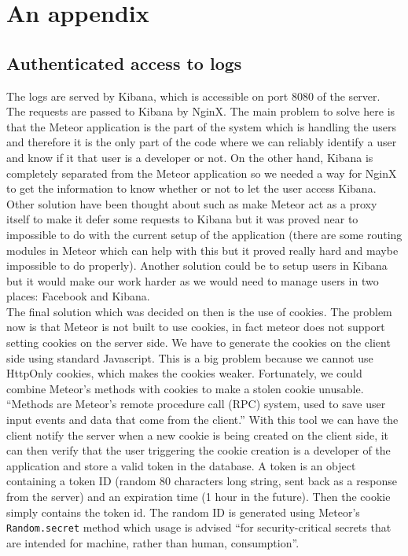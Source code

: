 \appendix
\chapter{An appendix}

\section{Authenticated access to logs}\label{appendix:cookies}
The logs are served by Kibana, which is accessible on port 8080 of the server. The requests are passed to Kibana by NginX. The main problem to solve here is that the Meteor application is the part of the system which is handling the users and therefore it is the only part of the code where we can reliably identify a user and know if it that user is a developer or not. On the other hand, Kibana is completely separated from the Meteor application so we needed a way for NginX to get the information to know whether or not to let the user access Kibana.\\
Other solution have been thought about such as make Meteor act as a proxy itself to make it defer some requests to Kibana but it was proved near to impossible to do with the current setup of the application (there are some routing modules in Meteor which can help with this but it proved really hard and maybe impossible to do properly). Another solution could be to setup users in Kibana but it would make our work harder as we would need to manage users in two places: Facebook and Kibana.\\
The final solution which was decided on then is the use of cookies. The problem now is that Meteor is not built to use cookies, in fact meteor does not support setting cookies on the server side. We have to generate the cookies on the client side using standard Javascript. This is a big problem because we cannot use HttpOnly cookies\cite{httponly}, which makes the cookies weaker. Fortunately, we could combine Meteor's methods with cookies to make a stolen cookie unusable.\\
``Methods are Meteor’s remote procedure call (RPC) system, used to save user input events and data that come from the client.'' \cite{methods} With this tool we can have the client notify the server when a new cookie is being created on the client side, it can then verify that the user triggering the cookie creation is a developer of the application and store a valid token in the database. A token is an object containing a token ID (random 80 characters long string, sent back as a response from the server) and an expiration time (1 hour in the future). Then the cookie simply contains the token id. The random ID is generated using Meteor's \texttt{Random.secret} method which usage is advised ``for security-critical secrets that are intended for machine, rather than human, consumption''\cite{meteorrandom}.\\
